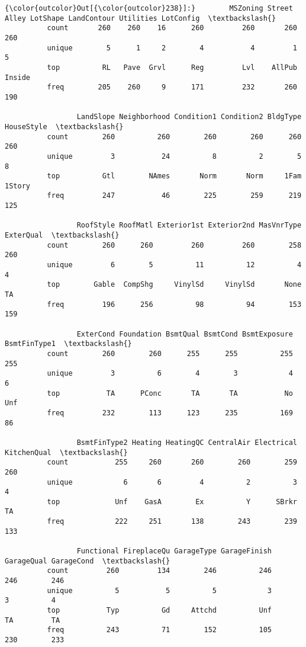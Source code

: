 \documentclass[11pt]{article}
\begin{document}
\begin{Verbatim}[commandchars=\\\{\}]
{\color{outcolor}Out[{\color{outcolor}238}]:}        MSZoning Street Alley LotShape LandContour Utilities LotConfig  \textbackslash{}
          count       260    260    16      260         260       260       260   
          unique        5      1     2        4           4         1         5   
          top          RL   Pave  Grvl      Reg         Lvl    AllPub    Inside   
          freq        205    260     9      171         232       260       190   
          
                 LandSlope Neighborhood Condition1 Condition2 BldgType HouseStyle  \textbackslash{}
          count        260          260        260        260      260        260   
          unique         3           24          8          2        5          8   
          top          Gtl        NAmes       Norm       Norm     1Fam     1Story   
          freq         247           46        225        259      219        125   
          
                 RoofStyle RoofMatl Exterior1st Exterior2nd MasVnrType ExterQual  \textbackslash{}
          count        260      260         260         260        258       260   
          unique         6        5          11          12          4         4   
          top        Gable  CompShg     VinylSd     VinylSd       None        TA   
          freq         196      256          98          94        153       159   
          
                 ExterCond Foundation BsmtQual BsmtCond BsmtExposure BsmtFinType1  \textbackslash{}
          count        260        260      255      255          255          255   
          unique         3          6        4        3            4            6   
          top           TA      PConc       TA       TA           No          Unf   
          freq         232        113      123      235          169           86   
          
                 BsmtFinType2 Heating HeatingQC CentralAir Electrical KitchenQual  \textbackslash{}
          count           255     260       260        260        259         260   
          unique            6       6         4          2          3           4   
          top             Unf    GasA        Ex          Y      SBrkr          TA   
          freq            222     251       138        243        239         133   
          
                 Functional FireplaceQu GarageType GarageFinish GarageQual GarageCond  \textbackslash{}
          count         260         134        246          246        246        246   
          unique          5           5          5            3          3          4   
          top           Typ          Gd     Attchd          Unf         TA         TA   
          freq          243          71        152          105        230        233   
          

\end{Verbatim}
\end{document}
